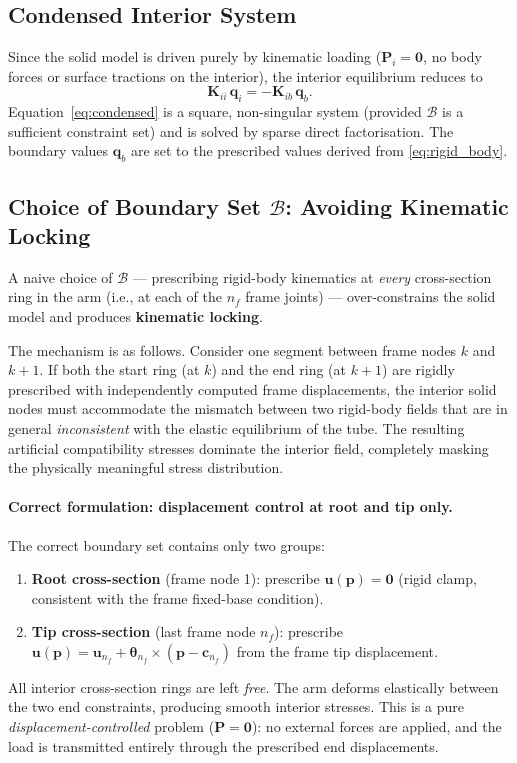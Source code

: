 \documentclass{article}
\begin{document}
\subsection{Condensed Interior System}

Since the solid model is driven purely by kinematic loading ($\bm{P}_i = \bm{0}$,
no body forces or surface tractions on the interior), the interior equilibrium
reduces to
\begin{equation}
    \bm{K}_{ii}\,\bm{q}_i = -\bm{K}_{ib}\,\bm{q}_b.
    \label{eq:condensed}
\end{equation}
Equation~\eqref{eq:condensed} is a square, non-singular system (provided
$\mathcal{B}$ is a sufficient constraint set) and is solved by sparse direct
factorisation.  The boundary values $\bm{q}_b$ are set to the prescribed
values derived from \eqref{eq:rigid_body}.

\subsection{Choice of Boundary Set $\mathcal{B}$: Avoiding Kinematic Locking}
\label{sec:locking}

A naive choice of $\mathcal{B}$ — prescribing rigid-body kinematics at
\emph{every} cross-section ring in the arm (i.e., at each of the $n_f$
frame joints) — over-constrains the solid model and produces
\textbf{kinematic locking}.

The mechanism is as follows.  Consider one segment between frame nodes $k$
and $k+1$.  If both the start ring (at $k$) and the end ring (at $k+1$) are
rigidly prescribed with independently computed frame displacements, the
interior solid nodes must accommodate the mismatch between two rigid-body
fields that are in general \emph{inconsistent} with the elastic equilibrium of
the tube.  The resulting artificial compatibility stresses dominate the
interior field, completely masking the physically meaningful stress distribution.

\paragraph{Correct formulation: displacement control at root and tip only.}
The correct boundary set contains only two groups:
\begin{enumerate}
    \item \textbf{Root cross-section} (frame node 1): prescribe $\bm{u}(\bm{p}) = \bm{0}$
          (rigid clamp, consistent with the frame fixed-base condition).
    \item \textbf{Tip cross-section} (last frame node $n_f$): prescribe
          $\bm{u}(\bm{p}) = \bm{u}_{n_f} + \bm{\theta}_{n_f} \times (\bm{p} - \bm{c}_{n_f})$
          from the frame tip displacement.
\end{enumerate}
All interior cross-section rings are left \emph{free}.  The arm deforms
elastically between the two end constraints, producing smooth interior
stresses.  This is a pure \emph{displacement-controlled} problem ($\bm{P} =
\bm{0}$): no external forces are applied, and the load is transmitted entirely
through the prescribed end displacements.
\end{document}
